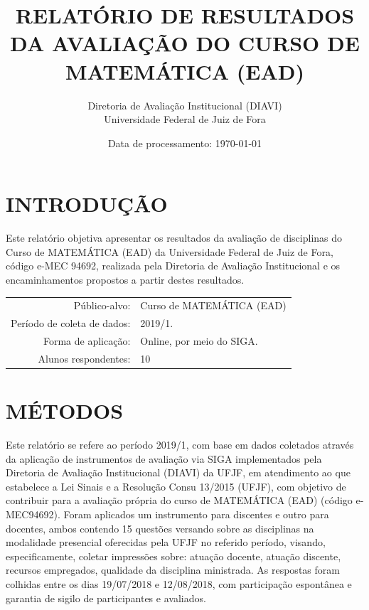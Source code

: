 \documentclass[a4paper,10pt]{article}
\date{Data de processamento: \today}
\begin{document}
\author{Diretoria de Avaliação Institucional (DIAVI) \\ Universidade Federal de Juiz de Fora}

\title{RELATÓRIO DE RESULTADOS DA AVALIAÇÃO DO CURSO DE MATEMÁTICA (EAD)}
\maketitle
\section{INTRODUÇÃO}
Este relatório objetiva apresentar os resultados da avaliação de disciplinas do Curso     de MATEMÁTICA (EAD) da Universidade Federal de Juiz de Fora, código e-MEC 94692, realizada pela     Diretoria de Avaliação Institucional e os encaminhamentos propostos a     partir destes resultados.

\begin{center}
\begin{tabularx}{\linewidth}{r|X}

Público-alvo:& Curso de MATEMÁTICA (EAD)\\

Período de coleta de dados:& 2019/1.\\

Forma de aplicação:& Online, por meio do SIGA.\\

Alunos respondentes:& 10\\
\end{tabularx}
\end{center}

\section{MÉTODOS}
Este relatório se refere ao período 2019/1, com base em dados     coletados através da aplicação de instrumentos de avaliação via SIGA     implementados pela Diretoria de Avaliação Institucional (DIAVI) da UFJF, em atendimento     ao que estabelece a Lei Sinais e a Resolução Consu 13/2015 (UFJF),     com objetivo de contribuir para a avaliação própria do curso de MATEMÁTICA (EAD) (código e-MEC94692). Foram aplicados um instrumento para discentes e outro para docentes, ambos contendo     15 questões versando sobre as disciplinas na modalidade presencial oferecidas pela UFJF no     referido período, visando, especificamente, coletar impressões sobre: atuação docente, atuação discente,     recursos empregados, qualidade da disciplina ministrada.     As respostas foram colhidas entre os dias 19/07/2018 e 12/08/2018, com participação espontânea e garantia de    sigilo de participantes e avaliados.
\end{document}
